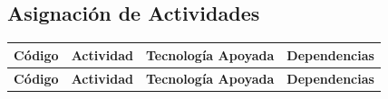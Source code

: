 \documentclass[letterpaper, 11pt]{report}
\begin{document}
\newpage
\subsection{Asignación de Actividades}

\begin{longtable}{|c|p{.3\linewidth}|p{.3\linewidth}|p{.3\linewidth}|}
      \hline

      \textbf{Código}                                                           & \textbf{Actividad}                     & \textbf{Tecnología Apoyada} & \textbf{Dependencias} \\
      \hline
      \endfirsthead

      \hline

      \textbf{Código}                                                           & \textbf{Actividad}                     & \textbf{Tecnología Apoyada} & \textbf{Dependencias} \\
      \hline
      \endhead


\end{longtable}
\end{document}
